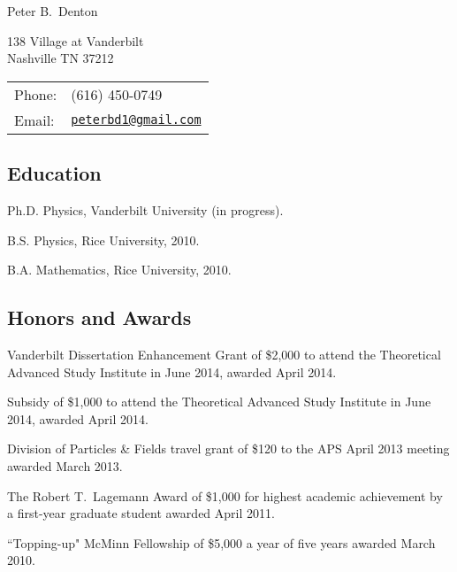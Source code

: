 \documentclass[letterpaper]{article}
\def\name{Peter B.~Denton}
\renewenvironment{itemize}{
\begin{list}{}{
\setlength{\leftmargin}{1.5em}
}
}{
\end{list}
}
\begin{document}
{\huge \name}


\vspace{0.1in}

\begin{minipage}{0.45\linewidth}
138 Village at Vanderbilt\\
Nashville TN 37212
\end{minipage}
\begin{minipage}{0.45\linewidth}
\begin{tabular}{ll}
Phone: & (616) 450-0749\\
Email: & \href{mailto:peterbd1@gmail.com}{\tt peterbd1@gmail.com} \\
\end{tabular}
\end{minipage}
\subsection*{Education}
\begin{itemize}
\item Ph.D. Physics, Vanderbilt University (in progress).
\item B.S. Physics, Rice University, 2010.
\item B.A. Mathematics, Rice University, 2010.
\end{itemize}
\subsection*{Honors and Awards}
\begin{itemize}
\item Vanderbilt Dissertation Enhancement Grant of \$2,000 to attend the Theoretical Advanced Study Institute in
June 2014, awarded April 2014.
\item Subsidy of \$1,000 to attend the Theoretical Advanced Study Institute in June 2014, awarded April 2014.
\item Division of Particles \& Fields travel grant of \$120 to the APS April 2013 meeting awarded March 2013.
\item The Robert T.~Lagemann Award of \$1,000 for highest academic achievement by a first-year graduate student awarded April 2011.
\item ``Topping-up" McMinn Fellowship of \$5,000 a year of five years awarded March 2010.
\end{itemize}
\end{document}
